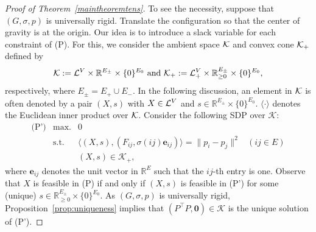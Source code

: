 \documentclass[11pt]{article}
\theoremstyle{definition}
\begin{document}
\begin{proof}[Proof of Theorem~\ref{maintheoremtens}]
To see the necessity, suppose that $(G,\sigma,p)$ is universally rigid. 
Translate the configuration so that the center of gravity is at the origin.
Our idea is to introduce a slack variable for each constraint of (P). 
For this, we consider the ambient space ${\cal K}$ and convex cone ${\cal K}_+$ defined by
\begin{align*}
\mathcal{K}:={\cal L}^V\times \mathbb{R}^{E_\pm} \times \{0\}^{E_0} \text{ and }
\mathcal{K}_+:={\cal L}^V_+\times \mathbb{R}^{E_\pm}_{\geq 0} \times \{0\}^{E_0},
\end{align*}
respectively, where $E_{\pm}=E_+ \cup E_-$.
In the following discussion, an element in ${\cal K}$ is often denoted by a pair $(X,s)$ with $X \in {\cal L}^V$ and $s \in \mathbb{R}^{E_\pm} \times \{0\}^{E_0}$.
$\langle \cdot \rangle$ denotes the Euclidean inner product over ${\cal K}$.
Consider the following SDP over $\mathcal{K}$:
    \[
\begin{array}{llll}
        \text{(P')} &  \text{max.}  & 0 \\
         & \text{s.t.}  & \langle (X,s), (F_{ij}, \sigma(ij) {\bm e}_{ij}) \rangle   =  \| p_i-p_j\|^2 &(ij \in E) \\
         &              & (X,s) \in \mathcal{K}_+,
    \end{array}
\]
where ${\bm e}_{ij}$ denotes the unit vector in $\mathbb{R}^E$ such that the $ij$-th entry is one.
Observe that $X$ is feasible in (P) if and only if  $(X,s)$ is feasible in (P') for some (unique) $s\in \mathbb{R}_{\geq 0}^{E_\pm} \times \{0\}^{E_0}$.
As $(G,\sigma,p)$ is universally rigid, Proposition~\ref{prop:uniqueness} implies that $(P^{\top}P, {\bm 0})\in \mathcal{K}$ is the unique solution of (P').


\end{proof}
\end{document}
